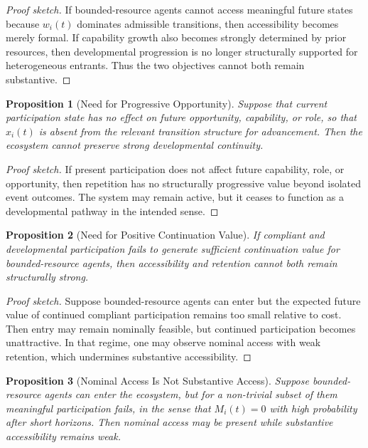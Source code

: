 \documentclass[11pt]{article}
\newtheorem{proposition}{Proposition}
\begin{document}
\begin{proof}[Proof sketch]
If bounded-resource agents cannot access meaningful future states because \(w_i(t)\) dominates admissible transitions, then accessibility becomes merely formal. If capability growth also becomes strongly determined by prior resources, then developmental progression is no longer structurally supported for heterogeneous entrants. Thus the two objectives cannot both remain substantive.
\end{proof}

\begin{proposition}[Need for Progressive Opportunity]
Suppose that current participation state has no effect on future opportunity, capability, or role, so that \(x_i(t)\) is absent from the relevant transition structure for advancement. Then the ecosystem cannot preserve strong developmental continuity.
\end{proposition}

\begin{proof}[Proof sketch]
If present participation does not affect future capability, role, or opportunity, then repetition has no structurally progressive value beyond isolated event outcomes. The system may remain active, but it ceases to function as a developmental pathway in the intended sense.
\end{proof}

\begin{proposition}[Need for Positive Continuation Value]
If compliant and developmental participation fails to generate sufficient continuation value for bounded-resource agents, then accessibility and retention cannot both remain structurally strong.
\end{proposition}

\begin{proof}[Proof sketch]
Suppose bounded-resource agents can enter but the expected future value of continued compliant participation remains too small relative to cost. Then entry may remain nominally feasible, but continued participation becomes unattractive. In that regime, one may observe nominal access with weak retention, which undermines substantive accessibility.
\end{proof}

\begin{proposition}[Nominal Access Is Not Substantive Access]
Suppose bounded-resource agents can enter the ecosystem, but for a non-trivial subset of them meaningful participation fails, in the sense that \(M_i(t)=0\) with high probability after short horizons. Then nominal access may be present while substantive accessibility remains weak.
\end{proposition}
\end{document}
